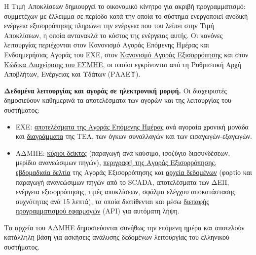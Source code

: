Η Τιμή Αποκλίσεων δημιουργεί το οικονομικό κίνητρο για ακριβή προγραμματισμό: συμμετέχων με
έλλειμμα σε περίοδο κατά την οποία το σύστημα ενεργοποιεί ανοδική ενέργεια εξισορρόπησης
πληρώνει την ενέργεια που του λείπει στην Τιμή Αποκλίσεων, η οποία αντανακλά το κόστος της
ενέργειας αυτής. Οι κανόνες λειτουργίας περιέχονται στον
Κανονισμό Αγοράς Επόμενης Ημέρας και Ενδοημερήσιας Αγοράς του ΕΧΕ, στον
\href{https://www.admie.gr/agora/rythmistiko-plaisio-agoras/kanonismos-agoras-eksisorropisis}{Κανονισμό
Αγοράς Εξισορρόπησης} και στον
\href{https://www.admie.gr/agora/rythmistiko-plaisio-agoras/kodikas-diaxeirisis-esmie}{Κώδικα
Διαχείρισης του ΕΣΜΗΕ}, οι οποίοι εγκρίνονται από τη Ρυθμιστική Αρχή Αποβλήτων, Ενέργειας και
Υδάτων (ΡΑΑΕΥ).

\textbf{Δεδομένα λειτουργίας και αγοράς σε ηλεκτρονική μορφή.} Οι διαχειριστές δημοσιεύουν
καθημερινά τα αποτελέσματα των αγορών και της λειτουργίας του συστήματος:

\begin{itemize}
\item ΕΧΕ:
      \href{https://www.enexgroup.gr/el/web/guest/markets-publications-el-day-ahead-market}{αποτελέσματα
      της Αγοράς Επόμενης Ημέρας} ανά αγοραία χρονική μονάδα και
      \href{https://www.enexgroup.gr/el/web/guest/day-ahead-market-figures}{διαγράμματα} της ΤΕΑ,
      των όγκων συναλλαγών και των εισαγωγών-εξαγωγών.
\item ΑΔΜΗΕ:
      \href{https://www.admie.gr/agora/statistika-agoras/kyrioi-deiktes-dashboard/paragogi-ana-kaysimo-isozygio-diasyndeseon}{κύριοι
      δείκτες} (παραγωγή ανά καύσιμο, ισοζύγιο διασυνδέσεων, μερίδιο ανανεώσιμων πηγών),
      \href{https://www.admie.gr/agora/genika/agora-eksisorropisis}{περιγραφή της Αγοράς
      Εξισορρόπησης},
      \href{https://www.admie.gr/agora/enimerotika-deltia/ebdomadiaia-deltia-agoras-eksisorropisis}{εβδομαδιαία
      δελτία} της Αγοράς Εξισορρόπησης και
      \href{https://www.admie.gr/agora/statistika-agoras/dedomena}{αρχεία δεδομένων} (φορτίο και
      παραγωγή ανανεώσιμων πηγών από το SCADA, αποτελέσματα των ΔΕΠ, ενέργεια εξισορρόπησης,
      τιμές αποκλίσεων, σφάλμα ελέγχου αποκατάστασης συχνότητας ανά 15 λεπτά), τα οποία
      διατίθενται και μέσω
      \href{https://www.admie.gr/agora/statistika-agoras/file-download-api}{διεπαφής
      προγραμματισμού εφαρμογών} (API) για αυτόματη λήψη.
\end{itemize}

Τα αρχεία του ΑΔΜΗΕ δημοσιεύονται συνήθως την επόμενη ημέρα και αποτελούν κατάλληλη βάση για
ασκήσεις ανάλυσης δεδομένων λειτουργίας του ελληνικού συστήματος.

